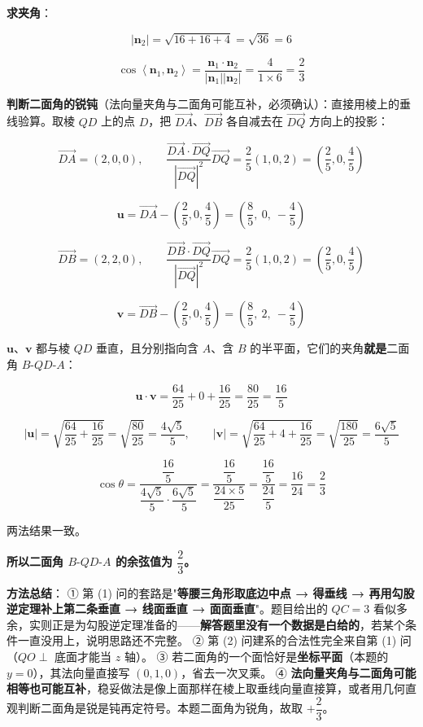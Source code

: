 \textbf{求夹角}：

\[\left|\boldsymbol n_2\right|=\sqrt{16+16+4}=\sqrt{36}=6\]

\[\cos\left\langle\boldsymbol n_1,\boldsymbol n_2\right\rangle=\frac{\boldsymbol n_1\cdot\boldsymbol n_2}{\left|\boldsymbol n_1\right|\left|\boldsymbol n_2\right|}=\frac{4}{1\times6}=\frac23\]

\textbf{判断二面角的锐钝}（法向量夹角与二面角可能互补，必须确认）：直接用棱上的垂线验算。取棱 $QD$ 上的点 $D$，把 $\overrightarrow{DA}$、$\overrightarrow{DB}$ 各自减去在 $\overrightarrow{DQ}$ 方向上的投影：

\[\overrightarrow{DA}=(2,0,0),\qquad \frac{\overrightarrow{DA}\cdot\overrightarrow{DQ}}{\left|\overrightarrow{DQ}\right|^{2}}\overrightarrow{DQ}=\frac25(1,0,2)=\left(\frac25,0,\frac45\right)\]

\[\boldsymbol u=\overrightarrow{DA}-\left(\frac25,0,\frac45\right)=\left(\frac85,\ 0,\ -\frac45\right)\]

\[\overrightarrow{DB}=(2,2,0),\qquad \frac{\overrightarrow{DB}\cdot\overrightarrow{DQ}}{\left|\overrightarrow{DQ}\right|^{2}}\overrightarrow{DQ}=\frac25(1,0,2)=\left(\frac25,0,\frac45\right)\]

\[\boldsymbol v=\overrightarrow{DB}-\left(\frac25,0,\frac45\right)=\left(\frac85,\ 2,\ -\frac45\right)\]

$\boldsymbol u$、$\boldsymbol v$ 都与棱 $QD$ 垂直，且分别指向含 $A$、含 $B$ 的半平面，它们的夹角\textbf{就是}二面角 $B\text{-}QD\text{-}A$：

\[\boldsymbol u\cdot\boldsymbol v=\frac{64}{25}+0+\frac{16}{25}=\frac{80}{25}=\frac{16}5\]

\[|\boldsymbol u|=\sqrt{\frac{64}{25}+\frac{16}{25}}=\sqrt{\frac{80}{25}}=\frac{4\sqrt5}5,\qquad |\boldsymbol v|=\sqrt{\frac{64}{25}+4+\frac{16}{25}}=\sqrt{\frac{180}{25}}=\frac{6\sqrt5}5\]

\[\cos\theta=\frac{\dfrac{16}5}{\dfrac{4\sqrt5}5\cdot\dfrac{6\sqrt5}5}=\frac{\dfrac{16}5}{\dfrac{24\times5}{25}}=\frac{\dfrac{16}5}{\dfrac{24}5}=\frac{16}{24}=\frac23\]

两法结果一致。

\textbf{所以二面角 $B\text{-}QD\text{-}A$ 的余弦值为 $\dfrac23$。}


\begin{gktip}
\textbf{方法总结}：
① 第 (1) 问的套路是"\textbf{等腰三角形取底边中点 → 得垂线 → 再用勾股逆定理补上第二条垂直 → 线面垂直 → 面面垂直}"。题目给出的 $QC=3$ 看似多余，实则正是为勾股逆定理准备的——\textbf{解答题里没有一个数据是白给的}，若某个条件一直没用上，说明思路还不完整。
② 第 (2) 问建系的合法性完全来自第 (1) 问（$QO\perp$ 底面才能当 $z$ 轴）。
③ 若二面角的一个面恰好是\textbf{坐标平面}（本题的 $y=0$），其法向量直接写 $(0,1,0)$，省去一次叉乘。
④ \textbf{法向量夹角与二面角可能相等也可能互补}，稳妥做法是像上面那样在棱上取垂线向量直接算，或者用几何直观判断二面角是锐是钝再定符号。本题二面角为锐角，故取 $+\dfrac23$。
\end{gktip}

